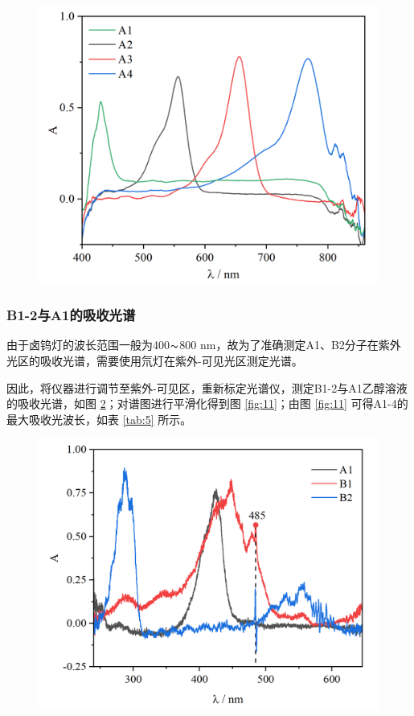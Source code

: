 \begin{figure}[H]
    \centering
    \includegraphics[width=.6\textwidth]{figures2/2-6.png}
    \label{fig:9}
\end{figure}

\subsubsection{B1-2与A1的吸收光谱}

由于卤钨灯的波长范围一般为400$\thicksim$800 \si{nm}\cite{pcl2002}，故为了准确测定A1、B2分子在紫外光区的吸收光谱，需要使用氘灯在紫外-可见光区测定光谱。

因此，将仪器进行调节至紫外-可见区，重新标定光谱仪，测定B1-2与A1乙醇溶液的吸收光谱，如图 \ref{fig:10}；对谱图进行平滑化得到图 \ref{fig:11}；由图 \ref{fig:11} 可得A1-4的最大吸收光波长，如表 \ref{tab:5} 所示。

\begin{figure}[H]
    \centering
    \includegraphics[width=.6\textwidth]{figures2/2-3.png}
    \label{fig:10}
\end{figure}

